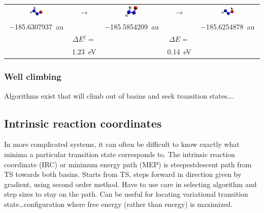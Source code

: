 \documentclass[11pt]{article}
\begin{document}
\begin{center}
\begin{tabular}{ccccc}
\includegraphics[width=0.22\textwidth]{./Images/H2NNO.png}
 & \(\longrightarrow\) & 
\includegraphics[width=0.22\textwidth]{./Images/H2NNO-TS.png} & \(\longrightarrow\) & \includegraphics[width=0.22\textwidth]{./Images/HNNOH.png} \\
\SI{-185.6307937}{au} &  & \SI{-185.5854209}{au} & & \SI{-185.6254878}{au}\\
  &  \(\Delta E^\ddagger =\) & & \(\Delta E =\) \\
  &  \SI{1.23}{eV} & &  \SI{0.14}{eV} \\
\end{tabular}
\end{center}

\subsubsection{Well climbing}
\label{sec:org3dd0cd0}
Algorithms exist that will climb out of basins and seek transition states\ldots{}.
\subsection{Intrinsic reaction coordinates}
\label{sec:orge227f8f}
In more complicated systems, it can often be difficult to know exactly what minima a particular transition state corresponds to. The intrinsic reaction coordinate (IRC) or minimum energy path (MEP) is steepestdescent path from TS towards both basins. Starts from TS, steps forward in direction given by gradient, using second order method. Have to use care in selecting algorithm and step sizes to stay on the path. Can be useful for locating variational transition state\ldots{}configuration where free energy (rather than energy) is maximized. 
\end{document}
